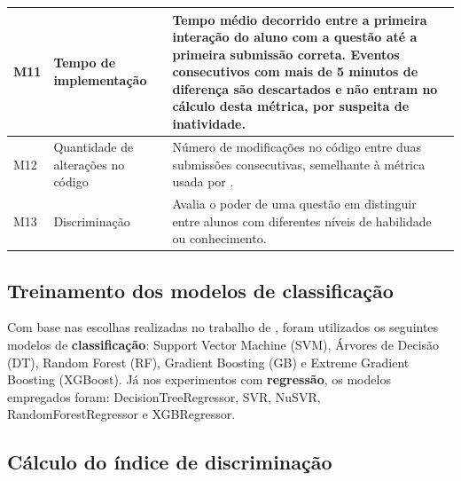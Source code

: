 \documentclass[12pt]{article}
\begin{document}
\begin{table}[!h]
\begin{tabular}{lL{.2\textwidth}L{.7\textwidth}}
        M11 & Tempo de implementação             & Tempo médio decorrido entre a primeira interação do aluno com a questão até a primeira submissão correta. Eventos consecutivos com mais de 5 minutos de diferença são descartados e não entram no cálculo desta métrica, por suspeita de inatividade.        \\ \midrule
        M12 & Quantidade de alterações no código & Número de modificações no código entre duas submissões consecutivas, semelhante à métrica  usada por \cite{marcos2021}.        \\ \midrule
        M13 & Discriminação                      & Avalia o poder de uma questão em distinguir entre alunos com diferentes níveis de habilidade ou conhecimento.       \\ \bottomrule
    \end{tabular}
\end{table}
    
\subsection{Treinamento dos modelos de classificação}

Com base nas escolhas realizadas no trabalho de \cite{jackson2023}, foram utilizados os seguintes modelos de \textbf{classificação}: Support Vector Machine (SVM), Árvores de Decisão (DT), Random Forest (RF), Gradient Boosting (GB) e Extreme Gradient Boosting (XGBoost). Já nos experimentos com \textbf{regressão}, os modelos empregados foram: DecisionTreeRegressor, SVR, NuSVR, RandomForestRegressor e XGBRegressor.

\subsection{Cálculo do índice de discriminação} \label{sec:calculo_disc}
\end{document}
